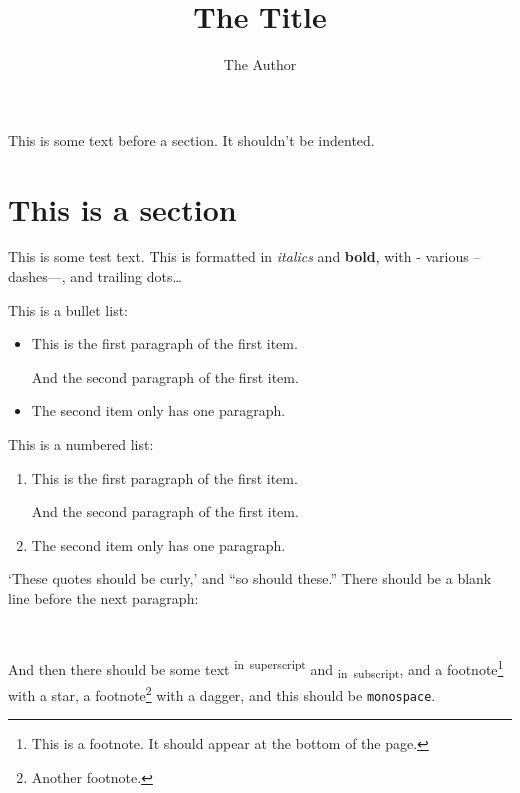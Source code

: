 \documentclass[
  12pt,
  a4paper,
]{article}
\title{The Title}
\author{The Author}
\date{}
\begin{document}
\maketitle

\frenchspacing


\makeatletter
\@afterindentfalse
\@afterheading
\makeatother

This is some text before a section. It shouldn't be indented.

\hypertarget{__h1_1}{%
\section{This is a section}\label{__h1_1}}

\makeatletter
\@afterindentfalse
\@afterheading
\makeatother

This is some test text. This is formatted in \emph{italics} and
\textbf{bold}, with - various -- dashes---, and trailing dots\ldots{}

This is a bullet list:

\begin{itemize}
\item
  This is the first paragraph of the first item.

  And the second paragraph of the first item.
\item
  The second item only has one paragraph.
\end{itemize}

\makeatletter
\@afterindentfalse
\@afterheading
\makeatother

This is a numbered list:

\begin{enumerate}
\def\labelenumi{\arabic{enumi}.}
\item
  This is the first paragraph of the first item.

  And the second paragraph of the first item.
\item
  The second item only has one paragraph.
\end{enumerate}

\makeatletter
\@afterindentfalse
\@afterheading
\makeatother

`These quotes should be curly,' and ``so should these.'' There should be
a blank line before the next paragraph:

~

\makeatletter
\@afterindentfalse
\@afterheading
\makeatother

And then there should be some text \textsuperscript{in~superscript} and
\textsubscript{in~subscript}, and a footnote\footnote{This is a
  footnote. It should appear at the bottom of the page.} with a star, a
footnote\footnote{Another footnote.} with a dagger, and this should be
\texttt{monospace}.
\end{document}
